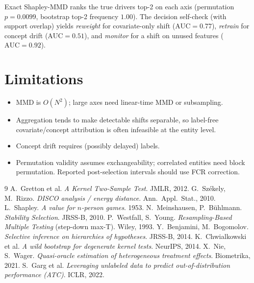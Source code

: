 \documentclass[11pt]{article}
\begin{document}
Exact Shapley-MMD ranks the true drivers top-2 on each axis (permutation
$p=0.0099$, bootstrap top-2 frequency $1.00$). The decision self-check (with
support overlap) yields \emph{reweight} for covariate-only shift
($\mathrm{AUC}=0.77$), \emph{retrain} for concept drift ($\mathrm{AUC}=0.51$),
and \emph{monitor} for a shift on unused features ($\mathrm{AUC}=0.92$).

\section{Limitations}
\begin{itemize}[leftmargin=2em]
\item MMD is $O(N^2)$; large axes need linear-time MMD or subsampling.
\item Aggregation tends to make detectable shifts separable, so label-free
      covariate/concept attribution is often infeasible at the entity level.
\item Concept drift requires (possibly delayed) labels.
\item Permutation validity assumes exchangeability; correlated entities need
      block permutation. Reported post-selection intervals should use FCR
      correction.
\end{itemize}

\begin{thebibliography}{9}
 A.\ Gretton et al. \emph{A Kernel Two-Sample Test}. JMLR, 2012.
 G.\ Sz\'ekely, M.\ Rizzo. \emph{DISCO analysis / energy distance}. Ann.\ Appl.\ Stat., 2010.
 L.\ Shapley. \emph{A value for $n$-person games}. 1953.
 N.\ Meinshausen, P.\ B\"uhlmann. \emph{Stability Selection}. JRSS-B, 2010.
 P.\ Westfall, S.\ Young. \emph{Resampling-Based Multiple Testing} (step-down max-T). Wiley, 1993.
 Y.\ Benjamini, M.\ Bogomolov. \emph{Selective inference on hierarchies of hypotheses}. JRSS-B, 2014.
 K.\ Chwialkowski et al. \emph{A wild bootstrap for degenerate kernel tests}. NeurIPS, 2014.
 X.\ Nie, S.\ Wager. \emph{Quasi-oracle estimation of heterogeneous treatment effects}. Biometrika, 2021.
 S.\ Garg et al. \emph{Leveraging unlabeled data to predict out-of-distribution performance (ATC)}. ICLR, 2022.
\end{thebibliography}
\end{document}
